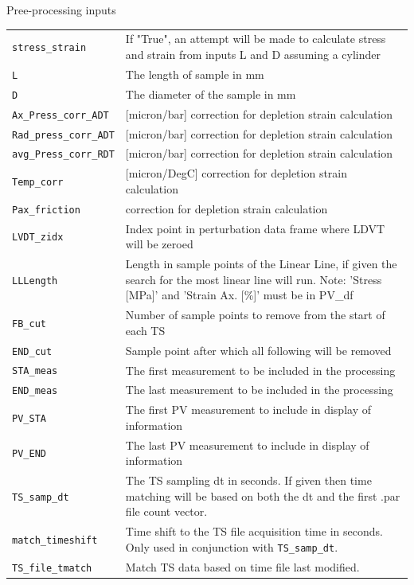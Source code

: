 \documentclass{article}
\begin{document}
Pree-processing inputs\newline
\begin{tabular}{l|p{120mm}}
\texttt{stress\_strain} & If "True", an attempt will be made to calculate stress and strain from inputs L and D assuming a cylinder\\
\texttt{L} & The length of sample in mm\\
\texttt{D} & The diameter of the sample in mm\\
\texttt{Ax\_Press\_corr\_ADT} & [micron/bar] correction for depletion strain calculation\\
\texttt{Rad\_press\_corr\_ADT} & [micron/bar] correction for depletion strain calculation\\
\texttt{avg\_Press\_corr\_RDT} & [micron/bar] correction for depletion strain calculation\\
\texttt{Temp\_corr} & [micron/DegC] correction for depletion strain calculation\\
\texttt{Pax\_friction} & correction for depletion strain calculation\\
\texttt{LVDT\_zidx} & Index point in perturbation data frame where LDVT will be zeroed\\
\texttt{LLLength} & Length in sample points of the Linear Line, if given the search for the most linear line will run. Note: 'Stress [MPa]' and 'Strain Ax. [\%]' must be in PV\_df\\
\texttt{FB\_cut} & Number of sample points to remove from the start of each TS\\
\texttt{END\_cut} & Sample point after which all following will be removed\\
\texttt{STA\_meas} & The first measurement to be included in the processing\\
\texttt{END\_meas} & The last measurement to be included in the processing\\
\texttt{PV\_STA} & The first PV measurement to include in display of information\\
\texttt{PV\_END} & The last PV measurement to include in display of information\\
\texttt{TS\_samp\_dt} & The TS sampling dt in seconds. If given then time matching will be based on both the dt and the first .par file count vector.\\
\texttt{match\_timeshift} & Time shift to the TS file acquisition time in seconds. Only used in conjunction with \texttt{TS\_samp\_dt}.\\
\texttt{TS\_file\_tmatch} & Match TS data based on time file last modified.\\
\end{tabular}
\newline
\end{document}

